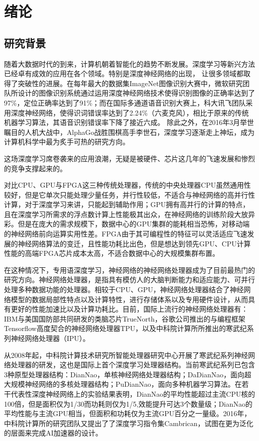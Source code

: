 ﻿\chapter{绪论}
\section{研究背景}
随着大数据时代的到来，计算机朝着智能化的趋势不断发展。深度学习等新兴方法已经卓有成效的应用在各个领域。特别是深度神经网络的出现，
让很多领域都取得了突破性的进展。在每年最大的数据集ImageNet图像识别大赛中，微软研究团队所设计的图像识别系统通过运用深度神经网络技术使得识别图像的正确率达到了97\%，定位正确率达到了91\%；而在国际多通道语音识别大赛上，科大讯飞团队采用深度神经网络，使得识词错误率达到了2.24\%（六麦克风），相比于原来的传统机器学习算法，其语音识别错误率下降了接近六成。 除此之外，在2016年3月举世瞩目的人机大战中，AlphaGo战胜围棋高手李世石，深度学习逐渐走上神坛，成为计算机科学中最为炙手可热的研究方向。

这场深度学习席卷袭来的应用浪潮，无疑是被硬件、芯片这几年的飞速发展和惨烈的竞争支撑起来的。

对比CPU、GPU与FPGA这三种传统处理器，传统的中央处理器CPU虽然通用性较好，但是它单次只能处理少量任务，并行性较低，不适合与神经网络的高并行性计算，对于深度学习来讲，只能起到辅助作用；GPU拥有高并行的计算的特点，且在深度学习所需求的浮点数计算上性能极其出众，在神经网络的训练阶段大放异彩。但是在庞大的需求规模下，数据中心的GPU集群的能耗相当恐怖，对移动端的神经网络前向运算实用性差。FPGA由于其可编程性的特征可以灵活适应飞速发展的神经网络算法的变迁，且性能功耗比出色，但是想达到领先GPU、CPU计算性能的高端FPGA芯片成本太高，不适合数据中心的大规模集群布置。

在这种情况下，专用语深度学习，神经网络的神经网络处理器成为了目前最热门的研究方向。神经网络处理器，是指具有模仿人的大脑判断能力和适应能力、可并行处理多种数据功能的处理器。相较于CPU、GPU，神经网络处理器结合了神经网络模型的数据局部性特点以及计算特性，进行存储体系以及专用硬件设计，从而具有更好的性能加速比以及计算功耗比。目前，国际上流行的神经网络处理器有：IBM与美国国防部共同研发的类脑芯片TrueNorth，谷歌公司推出的与编程框架Tensorflow高度契合的神经网络处理器TPU，以及中科院计算所所推出的寒武纪系列神经网络处理器（IPU）。

从2008年起，中科院计算技术研究所智能处理器研究中心开展了寒武纪系列神经网络处理器的研发，这也是国际上首个深度学习处理器结构。当前寒武纪系列已包含3种原型处理器结构：DianNao，单核神经网络处理器结构；DaDianNao，面向超大规模神经网络的多核处理器结构；PuDianNao，面向多种机器学习算法。在若干代表性深度神经网络上的实验结果表明，DianNao的平均性能超过主流CPU核的100倍，但是面积仅为1/30而功耗则仅为1/5,效能提升可达3个数量级；DianNao的平均性能与主流GPU相当，但面积和功耗仅为主流GPU百分之一量级。2016年，中科院计算所的研究团队又提出了了深度学习指令集Cambrican，试图在更为泛化的层面来完成AI加速器的设计。

